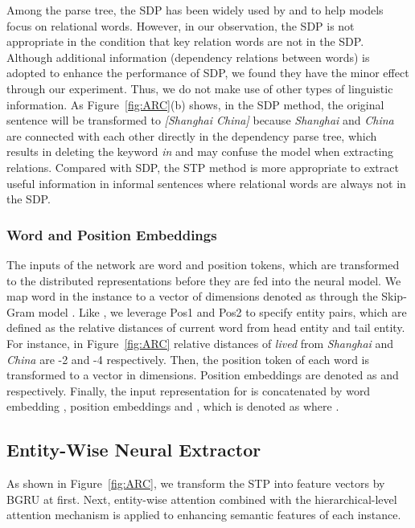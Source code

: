 \documentclass[11pt,a4paper]{article}
\begin{document}
  Among the parse tree, the SDP has been widely used by \citet{chen2014fast} and \citet{xu2015classifying} to help models focus on relational words. However, in our observation, the SDP is not appropriate in the condition that key relation words are not in the SDP. Although additional information (dependency relations between words) is adopted to enhance the performance of SDP, we found they have the minor effect through our experiment. Thus, we do not make use of other types of linguistic information. As Figure~\ref{fig:ARC}(b) shows, in the SDP method, the original sentence will be transformed to \emph{[Shanghai China]} because \emph{Shanghai} and \emph{China} are connected with each other directly in the dependency parse tree, which results in deleting the keyword \emph{in} and may confuse the model when extracting relations. Compared with SDP, the STP method is more appropriate to extract useful information in informal sentences where relational words are always not in the SDP.
  
  \subsubsection*{Word and Position Embeddings}
  The inputs of the network are word and position tokens, which are transformed to the distributed representations before they are fed into the neural model. We map  word in the  instance to a vector of  dimensions denoted as  through the Skip-Gram model \citep{mikolov2013distributed}. Like \citet{zeng2014relation}, we leverage Pos1 and Pos2 to specify entity pairs, which are defined as the relative distances of current word from head entity and tail entity. For instance, in Figure~\ref{fig:ARC} relative distances of \emph{lived} from \emph{Shanghai} and \emph{China} are -2 and -4 respectively. Then, the position token of each word is transformed to a vector in  dimensions. Position embeddings are denoted as  and  respectively. Finally, the input representation for  is concatenated by word embedding , position embeddings  and  , which is denoted as  where .

  \subsection{Entity-Wise Neural Extractor}
  As shown in Figure~\ref{fig:ARC}, we transform the STP into feature vectors by BGRU at first. Next, entity-wise attention combined with the hierarchical-level attention mechanism is applied to enhancing semantic features of each instance.
\end{document}
